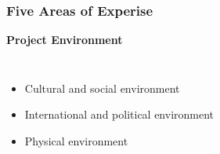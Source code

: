 \documentclass[aspectratio=169]{beamer}
\begin{document}
\begin{frame}
\frametitle{Five Areas of Experise}
\textbf{Project Environment}\\
\vspace{0.5cm}
\begin{columns}
\begin{itemize}
\item Cultural and social environment
\item International and political environment
\item Physical environment
\end{itemize}
\begin{figure}
\end{figure}
\end{columns}
\end{frame}
\end{document}
